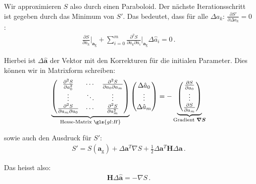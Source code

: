 Wir approximieren $S$ also durch einen Paraboloid. Der n\"achste Iterationsschritt ist gegeben durch das Minimum von $S'$. Das bedeutet, dass f\"ur alle $\Delta a_k \text{: } \frac{ \partial S' }{ \partial \Delta a_k} = 0$:
\begin{align}
\frac{ \partial S }{ \partial a_k } \bigg|_{\boldsymbol{a}_\mathrm{g}} + \sum_{i=0}^m \frac{ \partial^2 S }{ \partial a_k \partial a_i } \bigg|_{\boldsymbol{a}_\mathrm{g}} \Delta \hat{a}_i = 0 \,.
\label{eq:vl9-8}
\end{align}

Hierbei ist $\Delta \boldsymbol{\hat{a}}$ der Vektor mit den Korrekturen f\"ur die initialen Parameter. Dies k\"onnen wir in Matrixform schreiben:
\begin{align}
\underbrace{
\begin{pmatrix}
\frac{\partial^2 S}{\partial a_0^2}            & \cdots & \frac{\partial^2 S}{\partial a_0 \partial a_m} \\
\vdots                                         & \ddots & \vdots                                         \\
\frac{\partial^2 S}{\partial a_m \partial a_0} & \cdots & \frac{\partial^2 S}{\partial a_m^2}            
\end{pmatrix}}_{\text{Hesse-Matrix } \gls{gl:H}}
\begin{pmatrix}
\Delta \hat{a}_0 \\
\vdots           \\
\Delta \hat{a}_m 
\end{pmatrix}
= -
\underbrace{
\begin{pmatrix}
\frac{\partial S}{\partial a_0} \\
\vdots                          \\
\frac{\partial S}{\partial a_m}
\end{pmatrix}}_{\text{Gradient } \boldsymbol{\nabla S}}
\label{eq:vl9-9}
\end{align}

sowie auch den Ausdruck f\"ur $S'$:
\begin{align}
S' = S (\boldsymbol{a}_\mathrm{g}) + \Delta \boldsymbol{a}^T \nabla S + \frac{1}{2} \Delta \boldsymbol{a}^T \boldsymbol{H} \Delta \boldsymbol{a} \,.
\label{eq:vl9-10}
\end{align}

Das heisst also:
\begin{align}
\boldsymbol{H} \Delta \boldsymbol{\hat{a}} = - \nabla S\,.
\label{eq:vl9-11}
\end{align}

